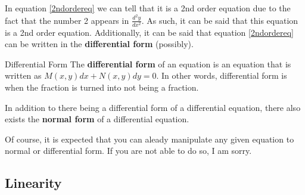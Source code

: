 \documentclass[letter, 11pt]{book}
\begin{document}
In equation \eqref{2ndordereq} we can tell that it is a 2nd order equation due to the fact that the number 2 appears in
$\frac{d^2y}{dx^2}$. As such, it can be said that this equation is a 2nd order equation. 
Additionally, it can be said that equation \eqref{2ndordereq} can be  written in the \textbf{differential form} (possibly).
\begin{definition}{Differential Form}{}
	The \textbf{differential form} of an equation is an equation that is written as $M(x, y)dx + N(x, y)dy = 0$.	
	In other words, differential form is when the fraction is turned into not being a fraction.
\end{definition}

In addition to there being a differential form of a differential equation, there also exists the \textbf{normal form} of a differential equation.

Of course, it is expected that you can aleady manipulate any given equation to normal or differential form. If you are
not able to do so, I am sorry.

\subsection{Linearity}
\end{document}
